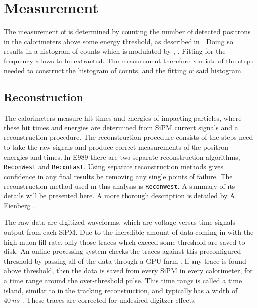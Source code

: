 
\thispagestyle{myheadings}

\graphicspath{{Body/Figures/RatioAnalysis/}{Body/Figures/RatioAnalysis/MethodOverview/}}

\chapter{\texorpdfstring{\wa}{wa} Measurement}
\label{chapter:SpinPrecessionMeasurement}


The measurement of \wa is determined by counting the number of detected positrons in the calorimeters above some energy threshold, as described in . Doing so results in a histogram of counts which is modulated by \wa, . Fitting for the frequency allows \wa to be extracted. The \wa measurement therefore consists of the steps needed to construct the histogram of counts, and the fitting of said histogram.


\section{Reconstruction}
\label{sec:ReconWest}


The calorimeters measure hit times and energies of impacting particles, where these hit times and energies are determined from SiPM current signals and a reconstruction procedure. The reconstruction procedure consists of the steps need to take the raw signals and produce correct measurements of the positron energies and times. In E989 there are two separate reconstruction algorithms, \texttt{ReconWest} and \texttt{ReconEast}. Using separate reconstruction methods gives confidence in any final results be removing any single points of failure. The reconstruction method used in this analysis is \texttt{ReconWest}. A summary of its details will be presented here. A more thorough description is detailed by A. Fienberg \cite{AFThesis}.


The raw data are digitized waveforms, which are voltage versus time signals output from each SiPM. Due to the incredible amount of data coming in with the high muon fill rate, only those traces which exceed some threshold are saved to disk. An online processing system checks the traces against this preconfigured threshold by passing all of the data through a GPU farm \cite{Gohn:2016shi}. If any trace is found above threshold, then the data is saved from every SiPM in every calorimeter, for a time range around the over-threshold pulse. This time range is called a time island, similar to in the tracking reconstruction, and typically has a width of $\SI{40}{ns}$ \cite{AFThesis}. These traces are corrected for undesired digitzer effects.



